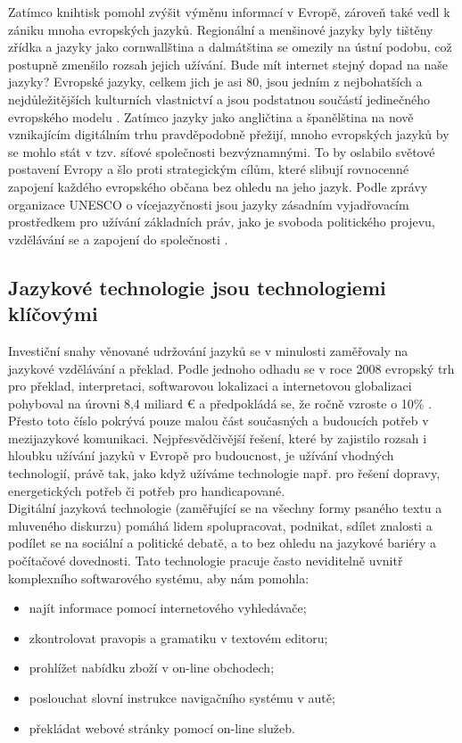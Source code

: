 \begin{multicols}{2}
Zatímco knihtisk pomohl zvýšit výměnu informací v Evropě, zároveň také vedl k zániku mnoha evropských jazyků. Regionální a menšinové jazyky byly tištěny zřídka a jazyky jako cornwallština a dalmátština se omezily na ústní podobu, což postupně zmenšilo rozsah jejich užívání. Bude mít internet stejný dopad na naše jazyky?
Evropské jazyky, celkem jich je asi 80, jsou jedním z nejbohatších a nejdůležitějších kulturních vlastnictví a jsou podstatnou součástí jedinečného evropského modelu \cite{EC2}. Zatímco jazyky jako angličtina a španělština na nově vznikajícím digitálním trhu pravděpodobně přežijí, mnoho evropských jazyků by se mohlo stát v tzv. síťové společnosti bezvýznamnými. To by oslabilo světové postavení Evropy a šlo proti strategickým cílům, které slibují rovnocenné zapojení každého evropského občana bez ohledu na jeho jazyk. Podle zprávy organizace UNESCO o vícejazyčnosti jsou jazyky zásadním vyjadřovacím prostředkem pro užívání základních práv, jako je svoboda politického projevu, vzdělávání se a zapojení do společnosti \cite{Unesco1}.

\subsection{Jazykové technologie jsou technologiemi klíčovými}

Investiční snahy věnované udržování jazyků se v minulosti zaměřovaly na jazykové vzdělávání a překlad. Podle jednoho odhadu se v roce 2008 evropský trh pro překlad, interpretaci, softwarovou lokalizaci a internetovou globalizaci pohyboval na úrovni 8,4 miliard € a předpokládá se, že ročně vzroste o 10\% \cite{EC3}. Přesto toto číslo pokrývá pouze malou část současných a budoucích potřeb v mezijazykové komunikaci. Nejpřesvědčivější řešení, které by zajistilo rozsah i hloubku užívání jazyků v Evropě pro budoucnost, je užívání vhodných technologií, právě tak, jako když užíváme technologie např. pro řešení dopravy, energetických potřeb či potřeb pro handicapované.\\
Digitální jazyková technologie (zaměřující se na všechny formy psaného textu a mluveného diskurzu) pomáhá lidem spolupracovat, podnikat, sdílet znalosti a podílet se na sociální a politické debatě, a to bez ohledu na jazykové bariéry a počítačové dovednosti. Tato technologie pracuje často neviditelně uvnitř komplexního softwarového systému, aby nám pomohla:

    \begin{itemize}
      \item najít informace pomocí internetového vyhledávače;
      \item zkontrolovat pravopis a gramatiku v textovém editoru;
      \item prohlížet nabídku zboží v on-line obchodech;
      \item poslouchat slovní instrukce navigačního systému v autě;
      \item překládat webové stránky pomocí on-line služeb.
    \end{itemize}
    

\end{multicols}
